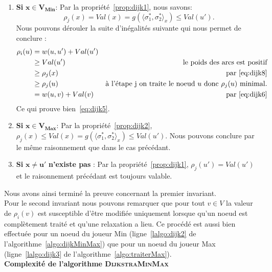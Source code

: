 \begin{enumerate}
\begin{enumerate}
	\item \textbf{Si }$\mathbf{x \in V_{Min}}$: Par la propriété~\ref{prop:dijk1}, nous savons:
	 \begin{equation}
		\label{eq:dijk8}\rho_j(x) = Val(x) = g(\langle \sigma_1^*, \sigma_2^* \rangle_x) \leq Val(u') .
	\end{equation}
	Nous pouvons dérouler la suite d'inégalités suivante qui nous permet de conclure : 
	\begin{align*}
		\rho_i(u) &= w(u,u') + Val(u')\\
		 		  &\geq Val(u') & \text{le poids des arcs est positif} \\
				  &\geq \rho_j(x) & \text{par}~\eqref{eq:dijk8} \\
				  &\geq \rho_j(u) & \text{à l'étape j on traite le noeud } u \text{ donc } \rho_j(u) \text{ minimal.}\\
				  &= w(u,v) + Val(v) & \text{par}~\eqref{eq:dijk6}						
	\end{align*}
	Ce qui prouve bien~\eqref{eq:dijk5}.
	\item \textbf{Si }$\mathbf{x \in V_{Max}}$:	 Par la propriété~\ref{prop:dijk2}, $\rho_j(x) \leq Val(x) = g(\langle \sigma_1^*, \sigma_2^* \rangle_x) \leq Val(u') $. Nous pouvons conclure par le même raisonnement que dans le cas précédant.
	\item \textbf{Si }$\mathbf{x \neq u'}$\textbf{ n'existe pas }: Par la propriété~\ref{prop:dijk1}, $\rho_j(u') = Val(u')$ et le raisonnement précédant est toujours valable.
\end{enumerate}
\end{enumerate}

Nous avons ainsi terminé la preuve concernant la premier invariant.\\

Pour le second invariant nous pouvons remarquer que pour tout $v \in V$ la valeur de $\rho_i(v)$ est susceptible d'être modifiée uniquement lorsque qu'un noeud est complètement traité et qu'une relaxation a lieu. Ce procédé est aussi bien effectuée pour un noeud du joueur Min (ligne~\ref{lalgo:dijk2} de l'algorithme~\ref{algo:dijkMinMax}) que pour un noeud du joueur Max (ligne~\ref{lalgo:dijk3} de l'algorithme~\ref{algo:traiterMax}).\\

\noindent\textbf{Complexité de l'algorithme \textsc{DijkstraMinMax}}\\

	


 